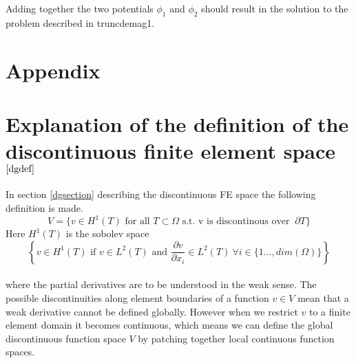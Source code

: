 \documentclass[12pt,a4paper,notitlepage]{article}
\begin{document}
\noindent Adding together the two potentials $\phi_1$ and $\phi_2$ should result in the solution to the problem described in
truncdemag1. 

\section*{Appendix}
\appendix
\section{Explanation of the definition of the discontinuous finite element space $\ref{dgdef}$ }\label{appdgspace}
In section \ref{dgsection} describing the discontinuous FE space the following definition is made.
\[
 V = \{ v \in H^1 (T) \mbox{ for all } T \subset \Omega \mbox{ s.t. v is discontinous over } \ \partial T \}
\]
Here $H^1(T)$ is the sobolev space 
\[ \left\{ v \in H^1(T) \mbox{ if } v \in L^2(T) \mbox{ and } \frac{\partial v}{\partial x_i} \in L^2(T) \ \forall 
i \in \{1...,dim(\Omega)\}  \right\} \]
\\
where the partial derivatives are to be understood in the weak sense.
The possible discontinuities along element boundaries of a function $v \in V$ mean that a weak derivative cannot be 
defined globally. However when we restrict $v$ to a finite element domain it becomes continuous, which 
means we can define the global discontinuous function space $V$ by patching together local continuous function spaces. 
\end{document}
